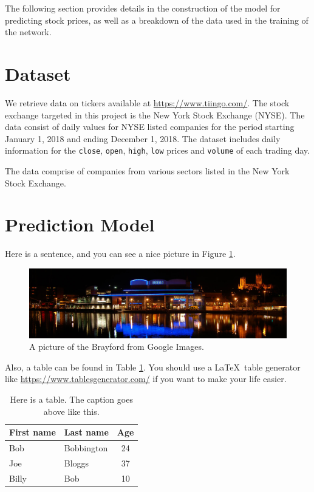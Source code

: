 The following section provides details in the construction of the model for predicting stock prices, as well as a breakdown of the data used in the training of the network.

\section{Dataset}
We retrieve data on tickers available at \url{https://www.tiingo.com/}. The stock exchange targeted in this project is the New York Stock Exchange (NYSE). The data consist of daily values for NYSE listed companies for the period starting January 1, 2018 and ending December 1, 2018. The dataset includes daily information for the \texttt{close}, \texttt{open}, \texttt{high}, \texttt{low} prices and \texttt{volume} of each trading day.

The data comprise of companies from various sectors listed in the New York Stock Exchange.

\section{Prediction Model}

Here is a sentence, and you can see a nice picture in Figure \ref{fig:brayford}.

\begin{figure}[ht]
    \centering
    \includegraphics[width=\textwidth]{figures/brayford.jpg}
    \caption{A picture of the Brayford from Google Images.}
    \label{fig:brayford}
\end{figure}

Also, a table can be found in Table \ref{tbl:example-table}. You should use a \LaTeX~table generator like \url{https://www.tablesgenerator.com/} if you want to make your life easier.

\begin{table}[ht]
    \caption{Here is a table. The caption goes above like this.}
    \centering
    \begin{tabular}{l|l|c}
        First name & Last name & Age \\
        \hline\hline
        Bob & Bobbington & 24 \\
        Joe & Bloggs & 37 \\
        Billy & Bob & 10 \\

    \end{tabular}
    \label{tbl:example-table}
\end{table}